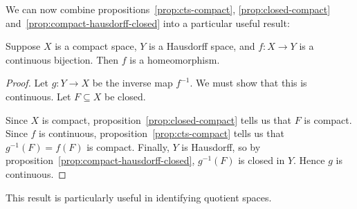 We can now combine propositions~\ref{prop:cts-compact}, \ref{prop:closed-compact} and~\ref{prop:compact-hausdorff-closed} into a particular useful result:

\begin{corollary}
	Suppose $X$ is a compact space, $Y$ is a Hausdorff space, and $f:X\to Y$ is a continuous bijection. Then $f$ is a homeomorphism. \label{cor:quot-result}
\end{corollary}

\begin{proof}
	Let $g:Y\to X$ be the inverse map $f^{-1}$. We must show that this is continuous. Let $F\subseteq X$ be closed.

	Since $X$ is compact, proposition~\ref{prop:closed-compact} tells us that $F$ is compact. Since $f$ is continuous, proposition~\ref{prop:cts-compact} tells us that $g^{-1}(F) = f(F)$ is compact. Finally, $Y$ is Hausdorff, so by proposition~\ref{prop:compact-hausdorff-closed}, $g^{-1}(F)$ is closed in $Y$. Hence $g$ is continuous.
\end{proof}

This result is particularly useful in identifying quotient spaces.

